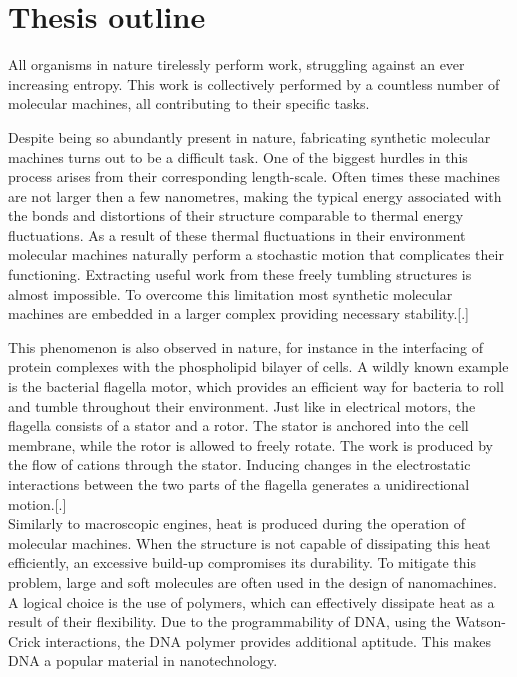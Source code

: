 \section{Thesis outline}

All organisms in nature tirelessly perform work, struggling against an ever increasing
entropy. This work is collectively performed by a countless number of molecular machines,
all contributing to their specific tasks.

Despite being so abundantly present in nature, fabricating synthetic molecular machines
turns out to be a difficult task. One of the biggest hurdles in this process arises from
their corresponding length-scale. Often times these machines are not larger then
a few nanometres, making the typical energy associated with the bonds and
distortions of their structure comparable to thermal energy fluctuations. As a result of
these thermal fluctuations in their environment molecular machines naturally perform
a stochastic motion that complicates their functioning.  Extracting useful work from
these freely tumbling structures is almost impossible. To overcome this limitation most
synthetic molecular machines are embedded in a larger complex providing necessary
stability.[.]

This phenomenon is also observed in nature, for instance in the interfacing of protein
complexes with the phospholipid bilayer of cells.  A wildly known example is the
bacterial flagella motor, which provides an efficient way for bacteria to
roll and tumble throughout their environment. Just like in electrical motors, the
flagella consists of a stator and a rotor. The stator is anchored into the cell membrane,
while the rotor is allowed to freely rotate. The work is produced by the flow of cations
through the stator. Inducing changes in the electrostatic interactions between the two
parts of the flagella generates a unidirectional motion.[.]\\

Similarly to macroscopic engines, heat is produced during the operation of molecular
machines. When the structure is not capable of dissipating this heat efficiently, an
excessive build-up compromises its durability. To mitigate this problem, large and soft
molecules are often used in the design of nanomachines. A logical choice
is the use of polymers, which can effectively dissipate heat as a result of their
flexibility.  Due to the programmability of DNA, using the Watson-Crick interactions,
the DNA polymer provides additional aptitude. This makes DNA a popular material in
nanotechnology.

